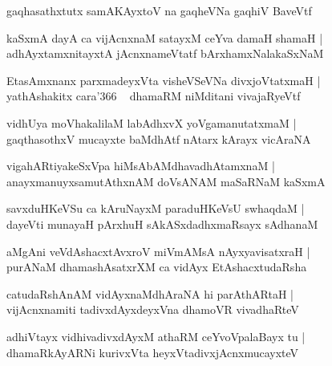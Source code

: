 \documentclass[twoside,12pt,openright]{book}
\newcounter{shloka}[chapter]
\begin{document}
\begin{shloka}
gaqhasathxtutx samAKAyxtoV na gaqheVNa gaqhiV BaveVtf \\
\end{shloka}
 
\begin{shloka}
kaSxmA dayA ca vijAcnxnaM satayxM ceYva damaH shamaH |\\
adhAyxtamxnitayxtA jAcnxnameVtatf bArxhamxNalakaSxNaM
\end{shloka}

\begin{shloka}
EtasAmxnanx parxmadeyxVta visheVSeVNa divxjoVtatxmaH |\\
yathAshakitx cara\char'366 ~ dhamaRM niMditani vivajaRyeVtf 
\end{shloka}

\begin{shloka}
vidhUya moVhakalilaM labAdhxvX yoVgamanutatxmaM |\\
gaqthasothxV mucayxte baMdhAtf nAtarx kArayx vicAraNA 
\end{shloka}

\begin{shloka}
vigahARtiyakeSxVpa hiMsAbAMdhavadhAtamxnaM |\\
anayxmanuyxsamutAthxnAM doVsANAM maSaRNaM kaSxmA 
\end{shloka}

\begin{shloka}
savxduHKeVSu ca kAruNayxM paraduHKeVsU swhaqdaM |\\
dayeVti munayaH pArxhuH sAkASxdadhxmaRsayx sAdhanaM 
\end{shloka}

\begin{shloka}
aMgAni veVdAshacxtAvxroV miVmAMsA nAyxyavisatxraH |\\
purANaM dhamashAsatxrXM ca vidAyx EtAshacxtudaRsha 
\end{shloka}

\begin{shloka}
catudaRshAnAM vidAyxnaMdhAraNA hi parAthARtaH |\\
vijAcnxnamiti tadivxdAyxdeyxVna dhamoVR vivadhaRteV 
\end{shloka}

\begin{shloka}
adhiVtayx vidhivadivxdAyxM athaRM ceYvoVpalaBayx tu |\\
dhamaRkAyARNi kurivxVta heyxVtadivxjAcnxmucayxteV 
\end{shloka}
\end{document}
